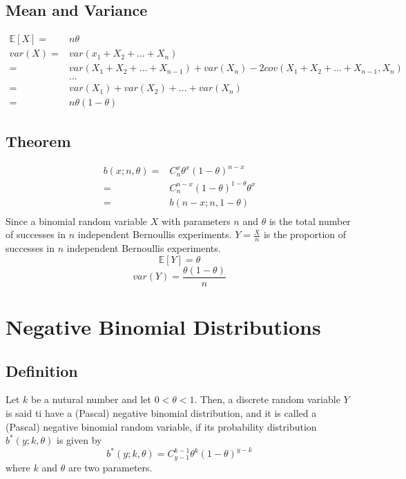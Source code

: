 \documentclass[titlepage]{article}
\begin{document}
        \subsection*{Mean and Variance}
                \begin{equation*}
                    \begin{split}
                        \mathbb{E}[X]=&n\theta\\
                        var(X)=&var(x_1+X_2+...+X_n)\\
                            =&var(X_1+X_2+...+X_{n-1})+var(X_n)-2cov(X_1+X_2+...+X_{n-1},X_n)\\
                            &...\\
                            =&var(X_1)+var(X_2)+...+var(X_n)\\
                            =&n\theta(1-\theta)
                    \end{split}
                \end{equation*}
            
        \subsection*{Theorem}
                    \begin{equation*}
                        \begin{split}
                            b(x;n,\theta)=&C_n^x\theta^x(1-\theta)^{n-x}\\
                                =&C_n^{n-x}(1-\theta)^{1-\theta}\theta^x\\
                                =&b(n-x;n,1-\theta)\\
                        \end{split}
                    \end{equation*}
                    Since a binomial random variable $X$ with parameters $n$ and $\theta$ is the total number of successes in $n$ independent Bernoullis experiments. $Y=\frac{X}{n}$ is the proportion of successes in $n$ independent Bernoullis experiments.
                    $$\mathbb{E}[Y]=\theta$$
                    $$var(Y)=\frac{\theta(1-\theta)}{n}$$
                

    \section{Negative Binomial Distributions}
        \subsection*{Definition}
                Let $k$ be a nutural number and let $0<\theta<1$. Then, a discrete random variable $Y$ is said ti have a (Pascal) negative binomial distribution, and it is called a (Pascal) negative binomial random variable, if its probability distribution $b^*(y;k,\theta)$ is given by
                $$b^*(y;k,\theta)=C_{y-1}^{k-1}\theta^k(1-\theta)^{y-k}$$
                where $k$ and $\theta$ are two parameters.
\end{document}
